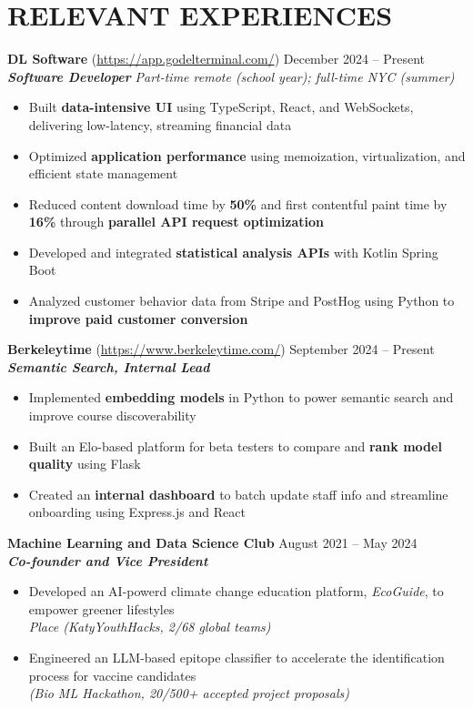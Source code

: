 \section*{RELEVANT EXPERIENCES}

\noindent
\textbf{DL Software} (\href{https://app.godelterminal.com/}{https://app.godelterminal.com/}) \hfill December 2024 -- Present \\
\textbf{\textit{Software Developer}} \hfill \textit{Part-time remote (school year); full-time NYC (summer)}
\begin{itemize}
	\item Built \textbf{data-intensive UI} using TypeScript, React, and WebSockets, delivering low-latency, streaming financial data
	\item Optimized \textbf{application performance} using memoization, virtualization, and efficient state management
	\item Reduced content download time by \textbf{50\%} and first contentful paint time by \textbf{16\%} through \textbf{parallel API request optimization}
	\item Developed and integrated \textbf{statistical analysis APIs} with Kotlin Spring Boot
	\item Analyzed customer behavior data from Stripe and PostHog using Python to \textbf{improve paid customer conversion}
\end{itemize}

\noindent
\textbf{Berkeleytime} (\href{https://www.berkeleytime.com/}{https://www.berkeleytime.com/}) \hfill September 2024 -- Present \\
\textbf{\textit{Semantic Search, Internal Lead}}
\begin{itemize}
	\item Implemented \textbf{embedding models} in Python to power semantic search and improve course discoverability
	\item Built an Elo-based platform for beta testers to compare and \textbf{rank model quality} using Flask
	\item Created an \textbf{internal dashboard} to batch update staff info and streamline onboarding using Express.js and React
\end{itemize}

\noindent
\textbf{Machine Learning and Data Science Club} \hfill August 2021 -- May 2024 \\
\textbf{\textit{Co-founder and Vice President}}
\begin{itemize}
	\item Developed an AI-powerd climate change education platform, \textit{EcoGuide}, to empower greener lifestyles \\ \textit{ Place (KatyYouthHacks, 2/68 global teams)}
	\item Engineered an LLM-based epitope classifier to accelerate the identification process for vaccine candidates \\ \textit{(Bio ML Hackathon, 20/500+ accepted project proposals)}
\end{itemize}

